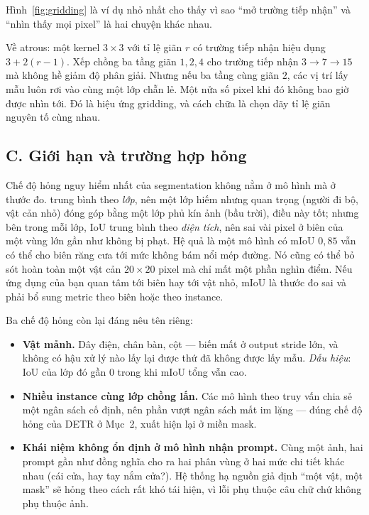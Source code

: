 \documentclass[../../../deep_learning.tex]{subfiles}
\begin{document}
Hình~\ref{fig:gridding} là ví dụ nhỏ nhất cho thấy vì sao ``mở trường tiếp nhận'' và ``nhìn thấy mọi pixel'' là hai chuyện khác nhau.

Về atrous: một kernel \(3\times3\) với tỉ lệ giãn \(r\) có trường tiếp nhận hiệu dụng \(3 + 2(r-1)\). Xếp chồng ba tầng giãn \(1, 2, 4\) cho trường tiếp nhận \(3 \to 7 \to 15\) mà không hề giảm độ phân giải. Nhưng nếu ba tầng cùng giãn \(2\), các vị trí lấy mẫu luôn rơi vào cùng một lớp chẵn lẻ. Một nửa số pixel khi đó không bao giờ được nhìn tới. Đó là hiệu ứng gridding, và cách chữa là chọn dãy tỉ lệ giãn nguyên tố cùng nhau.

\subsection{C. Giới hạn và trường hợp hỏng}
Chế độ hỏng nguy hiểm nhất của segmentation không nằm ở mô hình mà ở thước đo.  trung bình theo \emph{lớp}, nên một lớp hiếm nhưng quan trọng (người đi bộ, vật cản nhỏ) đóng góp bằng một lớp phủ kín ảnh (bầu trời), điều này tốt; nhưng bên trong mỗi lớp, IoU trung bình theo \emph{diện tích}, nên sai vài pixel ở biên của một vùng lớn gần như không bị phạt. Hệ quả là một mô hình có mIoU \(0{,}85\) vẫn có thể cho biên răng cưa tới mức không bám nổi mép đường. Nó cũng có thể bỏ sót hoàn toàn một vật cản \(20\times20\) pixel mà chỉ mất một phần nghìn điểm. Nếu ứng dụng của bạn quan tâm tới biên hay tới vật nhỏ, mIoU là thước đo sai và phải bổ sung metric theo biên hoặc theo instance.

Ba chế độ hỏng còn lại đáng nêu tên riêng:

\begin{itemize}
\item \textbf{Vật mảnh.} Dây điện, chân bàn, cột --- biến mất ở output stride lớn, và không có hậu xử lý nào lấy lại được thứ đã không được lấy mẫu. \emph{Dấu hiệu}: IoU của lớp đó gần 0 trong khi mIoU tổng vẫn cao.
\item \textbf{Nhiều instance cùng lớp chồng lấn.} Các mô hình theo truy vấn chia sẻ một ngân sách cố định, nên phần vượt ngân sách mất im lặng --- đúng chế độ hỏng của DETR ở Mục~2, xuất hiện lại ở miền mask.
\item \textbf{Khái niệm không ổn định ở mô hình nhận prompt.} Cùng một ảnh, hai prompt gần như đồng nghĩa cho ra hai phân vùng ở hai mức chi tiết khác nhau (cái cửa, hay tay nắm cửa?). Hệ thống hạ nguồn giả định ``một vật, một mask'' sẽ hỏng theo cách rất khó tái hiện, vì lỗi phụ thuộc câu chữ chứ không phụ thuộc ảnh.
\end{itemize}
\end{document}
